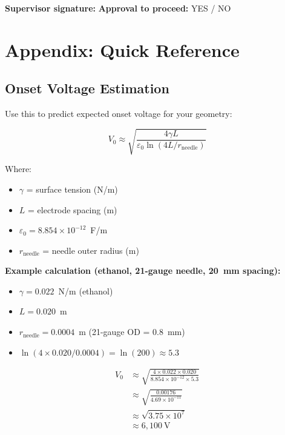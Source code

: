 \documentclass[11pt]{article}
\begin{document}
\vspace{1cm}

\noindent\textbf{Supervisor signature:} \underline{\hspace{5cm}}  
\textbf{Approval to proceed:} YES / NO

\section{Appendix: Quick Reference}

\subsection{Onset Voltage Estimation}

Use this to predict expected onset voltage for your geometry:

\begin{equation}
V_0 \approx \sqrt{\frac{4\gamma L}{\varepsilon_0 \ln(4L/r_{\text{needle}})}}
\end{equation}

Where:
\begin{itemize}
\item $\gamma$ = surface tension (N/m)
\item $L$ = electrode spacing (m)
\item $\varepsilon_0 = 8.854 \times 10^{-12}$~F/m
\item $r_{\text{needle}}$ = needle outer radius (m)
\end{itemize}

\textbf{Example calculation (ethanol, 21-gauge needle, 20~mm spacing):}

\begin{itemize}
\item $\gamma = 0.022$~N/m (ethanol)
\item $L = 0.020$~m
\item $r_{\text{needle}} = 0.0004$~m (21-gauge OD = 0.8~mm)
\item $\ln(4 \times 0.020/0.0004) = \ln(200) \approx 5.3$
\end{itemize}

\begin{align}
V_0 &\approx \sqrt{\frac{4 \times 0.022 \times 0.020}{8.854 \times 10^{-12} \times 5.3}} \\
&\approx \sqrt{\frac{0.00176}{4.69 \times 10^{-11}}} \\
&\approx \sqrt{3.75 \times 10^7} \\
&\approx 6,100~\text{V}
\end{align}
\end{document}
